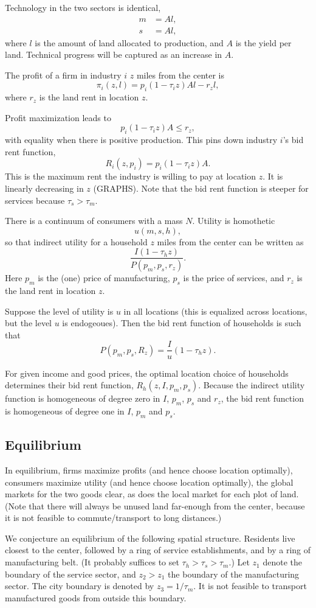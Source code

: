 \documentclass[letter]{amsart}
\theoremstyle{definition}
\theoremstyle{remark}
\numberwithin{equation}{section}
\begin{document}
Technology in the two sectors is identical,
\begin{align*}
m&=Al,\\
s&=Al,
\end{align*}
where $l$ is the amount of land allocated to production, and $A$ is the yield per land. Technical progress will be captured as an increase in $A$.

The profit of a firm in industry $i$ $z$ miles from the center is
\[
\pi_i(z,l) = p_i(1-\tau_i z)Al - r_zl,
\]
where $r_z$ is the land rent in location $z$.

Profit maximization leads to
\[
p_i(1-\tau_i z)A \le r_z,
\]
with equality when there is positive production. This pins down industry $i$'s bid rent function,
\[
R_i(z,p_i) = p_i(1-\tau_i z)A.
\]
This is the maximum rent the industry is willing to pay at location $z$. It is linearly decreasing in $z$ (GRAPHS). Note that the bid rent function is steeper for services because $\tau_s>\tau_m$.


There is a continuum of consumers with a mass $N$. Utility is homothetic
\[
u(m,s,h),
\]
so that indirect utility for a household $z$ miles from the center can be written as
\[
\frac{I(1-\tau_hz)}{P(p_m,p_s,r_z)}.
\]
Here $p_m$ is the (one) price of manufacturing, $p_s$ is the price of services, and $r_z$ is the land rent in location $z$.

Suppose the level of utility is $u$ in all locations (this is equalized across locations, but the level $u$ is endogeoues). Then the bid rent function of households is such that
\[
P(p_m,p_s,R_z) = \frac Iu (1-\tau_h z).
\]

For given income and good prices, the optimal location choice of households determines their bid rent function, $R_h(z,I,p_m,p_s)$. Because the indirect utility function is homogeneous of degree zero in $I$, $p_m$, $p_s$ and $r_z$, the bid rent function is homogeneous of degree one in $I$, $p_m$ and $p_s$.
\subsection{Equilibrium}
In equilibrium, firms maximize profits (and hence choose location optimally), consumers maximize utility (and hence choose location optimally), the global markets for the two goods clear, as does the local market for each plot of land. (Note that there will always be unused land far-enough from the center, because it is not feasible to commute/transport to long distances.)

We conjecture an equilibrium of the following spatial structure. Residents live closest to the center, followed by a ring of service establishments, and by a ring of manufacturing belt. (It probably suffices to set $\tau_h>\tau_s>\tau_m$.) Let $z_1$ denote the boundary of the service sector, and $z_2>z_1$ the boundary of the manufacturing sector. The city boundary is denoted by $z_3 = 1/\tau_m$. It is not feasible to transport manufactured goods from outside this boundary.
\end{document}
